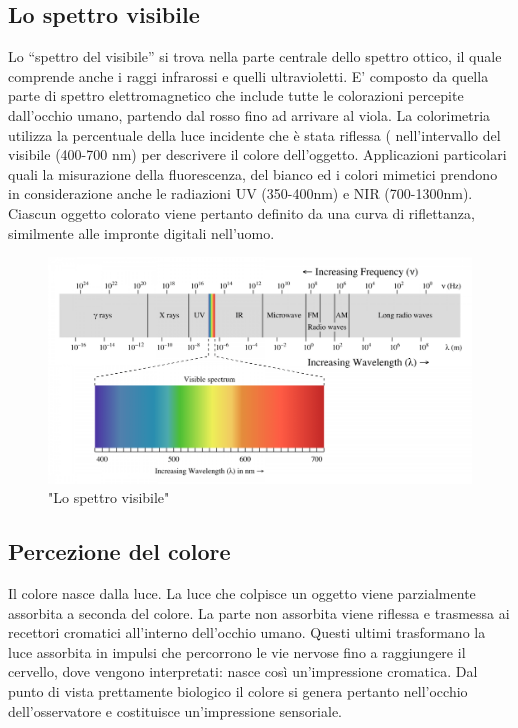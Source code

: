 \documentclass[a4paper,11pt]{article}
\begin{document}
        \subsection{Lo spettro visibile}
        Lo “spettro del visibile” si trova nella parte centrale dello spettro ottico, il quale
        comprende anche i raggi infrarossi e quelli ultravioletti. E’ composto da quella parte di
        spettro elettromagnetico che include tutte le colorazioni percepite dall’occhio umano,
        partendo dal rosso fino ad arrivare al viola.
        La colorimetria utilizza la percentuale della luce incidente che è stata riflessa (%
        nell'intervallo del visibile (400-700 nm) per descrivere il colore dell'oggetto. Applicazioni
        particolari quali la misurazione della fluorescenza, del bianco ed i colori mimetici prendono in
        considerazione anche le radiazioni UV (350-400nm) e NIR (700-1300nm). Ciascun oggetto
        colorato viene pertanto definito da una curva di riflettanza, similmente alle impronte digitali
        nell’uomo. 
        \begin{figure}[h]
            \centering
            \includegraphics[scale=0.3]{colorimetria3}
            \caption{"Lo spettro visibile"}
        \end{figure}
        \newpage
        \subsection{Percezione del colore}
        Il colore nasce dalla luce. La luce che colpisce un oggetto viene parzialmente assorbita a
        seconda del colore. La parte non assorbita viene riflessa e trasmessa ai recettori cromatici
        all’interno dell’occhio umano. Questi ultimi trasformano la luce assorbita in impulsi che
        percorrono le vie nervose fino a raggiungere il cervello, dove vengono interpretati: nasce così
        un’impressione cromatica. Dal punto di vista prettamente biologico il colore si genera pertanto
        nell’occhio dell’osservatore e costituisce un’impressione sensoriale.
\end{document}
